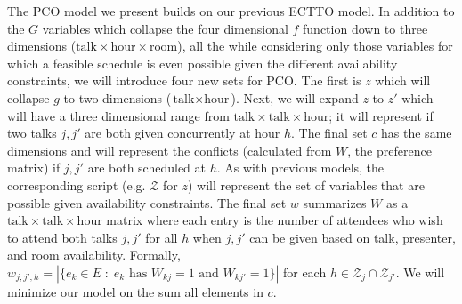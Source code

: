 \documentclass[]{article}
\theoremstyle{definition}
\theoremstyle{remark}
\numberwithin{equation}{section}
\begin{document}
The PCO model we present builds on our previous ECTTO model. In addition to the $G$ variables which collapse the four dimensional $f$ function down to three dimensions ($\text{talk} \times \text{hour} \times \text{room}$), all the while considering only those variables for which a feasible schedule is even possible given the different availability constraints, we will introduce four new sets for PCO. The first is $z$ which will collapse $g$ to two dimensions ($\text{talk} \times \text{hour}$). Next, we will expand $z$ to $z'$ which will have a three dimensional range from $\text{talk} \times \text{talk} \times \text{hour}$; it will represent if two talks $j, j'$ are both given concurrently at hour $h$. The final set $c$ has the same dimensions and will represent the conflicts (calculated from $W$, the preference matrix) if $j, j'$ are both scheduled at $h$. As with previous models, the corresponding script (e.g. $\mathcal Z$ for $z$) will represent the set of variables that are possible given availability constraints. The final set $w$ summarizes $W$ as a $\text{talk} \times \text{talk} \times \text{hour}$ matrix where each entry is the number of attendees who wish to attend both talks $j,j'$ for all $h$ when $j,j'$ can be given based on talk, presenter, and room availability. Formally, $w_{j,j',h} = |\{e_k \in E \; : \; e_k \text{ has } W_{kj} = 1 \text{ and } W_{kj'} = 1 \}|$ for each $h \in \mathcal{Z}_{j} \cap \mathcal{Z}_{j'}$. We will minimize our model on the sum all elements in $c$.
\end{document}
